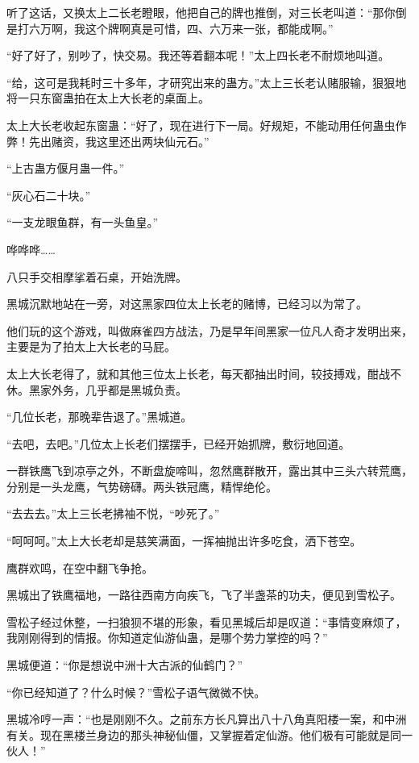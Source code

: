 \begin{this_body}
听了这话，又换太上二长老瞪眼，他把自己的牌也推倒，对三长老叫道：“那你倒是打六万啊，我这个牌啊真是可惜，四、六万来一张，都能成啊。”

“好了好了，别吵了，快交易。我还等着翻本呢！”太上四长老不耐烦地叫道。

“给，这可是我耗时三十多年，才研究出来的蛊方。”太上三长老认赌服输，狠狠地将一只东窗蛊拍在太上大长老的桌面上。

太上大长老收起东窗蛊：“好了，现在进行下一局。好规矩，不能动用任何蛊虫作弊！先出赌资，我这里还出两块仙元石。”

“上古蛊方偃月蛊一件。”

“灰心石二十块。”

“一支龙眼鱼群，有一头鱼皇。”

哗哗哗……

八只手交相摩挲着石桌，开始洗牌。

黑城沉默地站在一旁，对这黑家四位太上长老的赌博，已经习以为常了。

他们玩的这个游戏，叫做麻雀四方战法，乃是早年间黑家一位凡人奇才发明出来，主要是为了拍太上大长老的马屁。

太上大长老得了，就和其他三位太上长老，每天都抽出时间，较技搏戏，酣战不休。黑家外务，几乎都是黑城负责。

“几位长老，那晚辈告退了。”黑城道。

“去吧，去吧。”几位太上长老们摆摆手，已经开始抓牌，敷衍地回道。

一群铁鹰飞到凉亭之外，不断盘旋啼叫，忽然鹰群散开，露出其中三头六转荒鹰，分别是一头龙鹰，气势磅礴。两头铁冠鹰，精悍绝伦。

“去去去。”太上三长老拂袖不悦，“吵死了。”

“呵呵呵。”太上大长老却是慈笑满面，一挥袖抛出许多吃食，洒下苍空。

鹰群欢鸣，在空中翻飞争抢。

黑城出了铁鹰福地，一路往西南方向疾飞，飞了半盏茶的功夫，便见到雪松子。

雪松子经过休整，一扫狼狈不堪的形象，看见黑城后却是叹道：“事情变麻烦了，我刚刚得到的情报。你知道定仙游仙蛊，是哪个势力掌控的吗？”

黑城便道：“你是想说中洲十大古派的仙鹤门？”

“你已经知道了？什么时候？”雪松子语气微微不快。

黑城冷哼一声：“也是刚刚不久。之前东方长凡算出八十八角真阳楼一案，和中洲有关。现在黑楼兰身边的那头神秘仙僵，又掌握着定仙游。他们极有可能就是同一伙人！”


\end{this_body}
